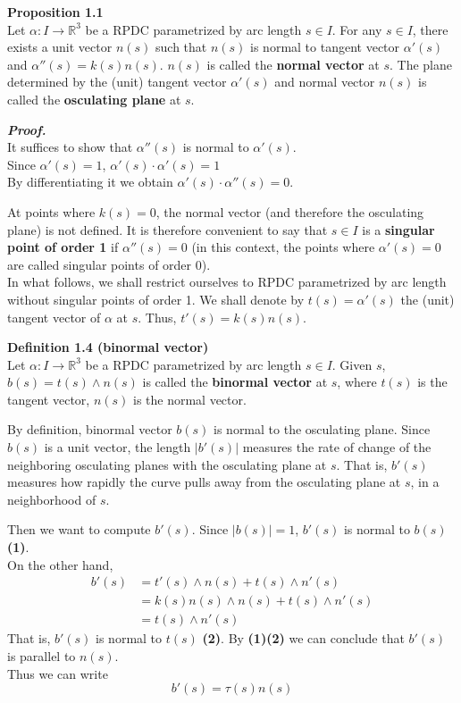 \documentclass{article}
\begin{document}
\par
\textbf{Proposition 1.1}\\
Let $\alpha: I \to \mathbb R^3$ be a RPDC parametrized by arc length $s \in I$. For any $s \in I$,
there exists a unit vector $n(s)$ such that $n(s)$ is normal to tangent vector $\alpha'(s)$ and
$\alpha''(s) = k(s)n(s)$. $n(s)$ is called the \textbf{normal vector} at $s$. The plane determined by the
(unit) tangent vector $\alpha'(s)$ and normal vector $n(s)$ is called the \textbf{osculating plane} at $s$.

\par
\textbf{\textit{Proof.}}\\
It suffices to show that $\alpha''(s)$ is normal to $\alpha'(s)$.\\
Since $\alpha'(s) = 1$, $\alpha'(s) \cdot \alpha'(s) = 1$\\
By differentiating it we obtain $\alpha'(s) \cdot \alpha''(s) = 0$.

\par
At points where $k(s) = 0$, the normal vector (and therefore the osculating plane) is not defined. It is
therefore convenient to say that $s \in I$ is a \textbf{singular point of order 1} if $\alpha''(s) = 0$ 
(in this context, the points where $\alpha'(s) = 0$ are called singular points of order 0).\\
In what follows, we shall restrict ourselves to RPDC parametrized by arc length without singular points
of order 1. We shall denote by $t(s) = \alpha'(s)$ the (unit) tangent vector of $\alpha$ at $s$. Thus,
$t'(s) = k(s)n(s)$.

\par
\textbf{Definition 1.4 (binormal vector)}\\
Let $\alpha: I \to \mathbb R^3$ be a RPDC parametrized by arc length $s \in I$. Given $s$, 
$b(s) = t(s) \land n(s)$ is called the \textbf{binormal vector} at $s$, where $t(s)$ is the tangent vector, 
$n(s)$ is the normal vector. 

\par
By definition, binormal vector $b(s)$ is normal to the osculating plane. Since $b(s)$ is a unit vector,
the length $|b'(s)|$ measures the rate of change of the neighboring osculating planes with the osculating
plane at $s$. That is, $b'(s)$ measures how rapidly the curve pulls away from the osculating plane at $s$,
in a neighborhood of $s$.

\par
Then we want to compute $b'(s)$. Since $|b(s)| = 1$, $b'(s)$ is normal to $b(s)$ \textbf{(1)}. \\
On the other hand,
$$
\begin{aligned}
    b'(s) &= t'(s) \land n(s) + t(s) \land n'(s) \\ &= k(s)n(s) \land n(s) + t(s) \land n'(s) \\ &= t(s) \land n'(s)
\end{aligned}
$$
That is, $b'(s)$ is normal to $t(s)$ \textbf{(2)}. By \textbf{(1)(2)} we can conclude that $b'(s)$ is parallel to 
$n(s)$.\\
Thus we can write 
$$
    b'(s) = \tau (s)n(s)
$$
\end{document}

